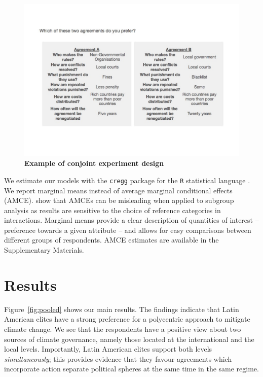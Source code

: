 \documentclass[a4paper,12pt]{article}
\begin{document}
\begin{figure}[H]
	\centering
	\includegraphics[width=13cm]{conjoint-cropped.pdf}
	\caption{\textbf{Example of conjoint experiment design}}
	\label{fig:conjoint}
\end{figure}

We estimate our models with the \texttt{cregg} package \citep{leeper2018cregg} for the \texttt{R} statistical language \citep{rstats2019}. We report marginal means instead of average marginal conditional effects (AMCE). \citet{leeper2018subgroup} show that AMCEs can be misleading when applied to subgroup analysis as results are sensitive to the choice of reference categories in interactions. Marginal means provide a clear description of quantities of interest -- preference towards a given attribute -- and allows for easy comparisons between different groups of respondents. AMCE estimates are available in the Supplementary Materials.

\section{Results}%
\label{sec:results}

Figure~\ref{fig:pooled} shows our main results. The findings indicate that Latin American elites have a strong preference for a polycentric approach to mitigate climate change. We see that the respondents have a positive view about two sources of climate governance, namely those located at the international and the local levels. Importantly, Latin American elites support both levels \textit{simultaneously}; this provides evidence that they favour agreements which incorporate action separate political spheres at the same time in the same regime. 
\end{document}

